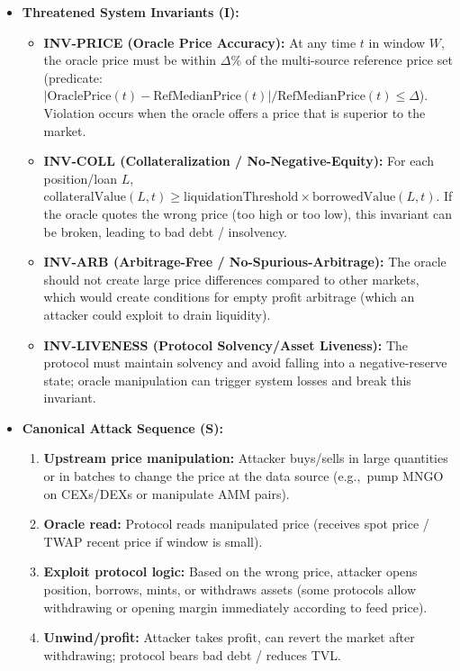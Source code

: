 \begin{itemize}
    \item \textbf{Threatened System Invariants (I):}
        \begin{itemize}
            \item \textbf{INV-PRICE (Oracle Price Accuracy):} At any time $t$ in window $W$, the oracle price must be within $\Delta\%$ of the multi-source reference price set (predicate: $|\text{OraclePrice}(t) - \text{RefMedianPrice}(t)|/\text{RefMedianPrice}(t) \leq \Delta$). Violation occurs when the oracle offers a price that is superior to the market.
            \item \textbf{INV-COLL (Collateralization / No-Negative-Equity):} For each position/loan $L$, $\text{collateralValue}(L,t) \geq \text{liquidationThreshold} \times \text{borrowedValue}(L,t)$. If the oracle quotes the wrong price (too high or too low), this invariant can be broken, leading to bad debt / insolvency.
            \item \textbf{INV-ARB (Arbitrage-Free / No-Spurious-Arbitrage):} The oracle should not create large price differences compared to other markets, which would create conditions for empty profit arbitrage (which an attacker could exploit to drain liquidity).
            \item \textbf{INV-LIVENESS (Protocol Solvency/Asset Liveness):} The protocol must maintain solvency and avoid falling into a negative-reserve state; oracle manipulation can trigger system losses and break this invariant.
        \end{itemize}

    \item \textbf{Canonical Attack Sequence (S):}
        \begin{enumerate}
            \item \textbf{Upstream price manipulation:} Attacker buys/sells in large quantities or in batches to change the price at the data source (e.g.,\ pump MNGO on CEXs/DEXs or manipulate AMM pairs).
            \item \textbf{Oracle read:} Protocol reads manipulated price (receives spot price / TWAP recent price if window is small).
            \item \textbf{Exploit protocol logic:} Based on the wrong price, attacker opens position, borrows, mints, or withdraws assets (some protocols allow withdrawing or opening margin immediately according to feed price).
            \item \textbf{Unwind/profit:} Attacker takes profit, can revert the market after withdrawing; protocol bears bad debt / reduces TVL.
        \end{enumerate}
\end{itemize}

